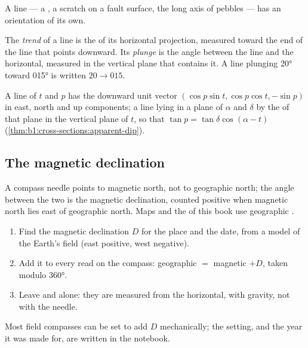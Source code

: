 A line --- a , a scratch on a fault surface, the long axis of
pebbles --- has an orientation of its own.

\begin{definition}\label{def:b1:field-lab-methods-1:trend-plunge}
The \emph{trend} of a line is the  of its
horizontal projection, measured toward the end of the line that points
downward. Its \emph{plunge} is the angle between the line and
the horizontal, measured in the vertical plane that contains it. A line
plunging \ang{20} toward \ang{015} is written $20\to015$.
\end{definition}

A line of  $t$ and  $p$ has the downward unit vector
$(\cos p\sin t, \cos p\cos t, -\sin p)$ in east, north and up components;
a line lying in a plane of  $\alpha$ and  $\delta$  by
the  of that plane in the vertical plane of  $t$, so that
$\tan p = \tan\delta\cos(\alpha - t)$ (\cref{thm:b1:cross-sections:apparent-dip}).

\subsection{The magnetic declination}

A compass needle points to magnetic north, not to geographic north; the angle
between the two is the magnetic declination, counted positive when magnetic
north lies east of geographic north. Maps and the  of this book use
geographic .

\begin{method}\label{met:b1:field-lab-methods-1:declination}
\begin{enumerate}
  \item Find the magnetic declination $D$ for the place and the date, from a
        model of the Earth's field (east positive, west negative).
  \item Add it to every  read on the compass: geographic  $=$
        magnetic  $+ D$, taken modulo \ang{360}.
  \item Leave  and  alone: they are measured from the horizontal,
        with gravity, not with the needle.
\end{enumerate}
Most field compasses can be set to add $D$ mechanically; the setting, and the
year it was made for, are written in the notebook.
\end{method}

